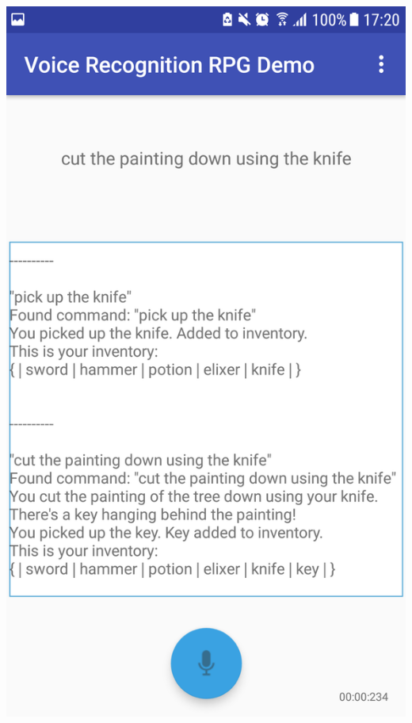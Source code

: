 \documentclass[11pt]{article}
\begin{document}
\begin{appendices}
\begin{center}
\includegraphics[scale=0.18]{overworld-2.png}
\newpage

\end{center}
\end{appendices}
\end{document}
